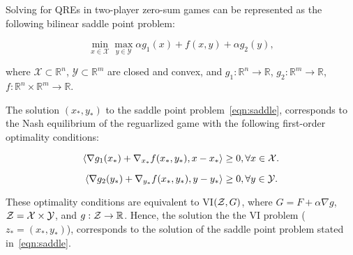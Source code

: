 Solving for QREs in two-player zero-sum games can be represented as the following bilinear saddle
point problem:

\begin{equation}
	\label{eqn:saddle} \min_{x \in \mathcal{X}}
	\max_{y \in \mathcal{Y}} \alpha g_1(x) + f(x, y) + \alpha g_2(y),
\end{equation}

where $\mathcal{X} \subset \mathbb{R}^n$, $\mathcal{Y} \subset \mathbb{R}^m$
are closed and convex, and $g_1: \mathbb{R}^n \rightarrow \mathbb{R}$, $g_2: \mathbb{R}^m
	\rightarrow \mathbb{R}$, $f : \mathbb{R}^n \times \mathbb{R}^m \rightarrow \mathbb{R}$.

The solution $(x_{\ast}, y_{\ast})$ to the saddle point problem~\ref{eqn:saddle}, corresponds to
the Nash equilibrium of the reguarlized game with the following first-order optimality conditions:

\begin{equation}
	\label{eqn:optcon1} \langle \nabla g_1(x_*) + \nabla_{x_*}
	f(x_*, y_*), x - x_* \rangle \geq 0, \forall x \in \mathcal{X}.
\end{equation}

\begin{equation}
	\label{eqn:optcon2}
	\langle \nabla g_2(y_*) + \nabla_{y_*} f(x_*, y_*),
	y - y_* \rangle \geq 0, \forall y \in \mathcal{Y}.
\end{equation}

These optimality conditions are equivalent to VI$(\mathcal{Z}, G)$, where $G = F + \alpha \nabla g$,
$\mathcal{Z} = \mathcal{X} \times \mathcal{Y}$, and $g: \mathcal{Z} \rightarrow \mathbb{R}$.
Hence, the solution the the VI problem ($z_{\ast}= (x_{\ast}, y_{\ast})$), corresponds to the
solution of the saddle point problem stated in~\ref{eqn:saddle}.





